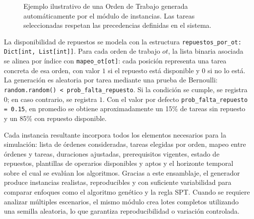 \begin{figure}[H]
\centering
\shorthandoff{>}
\shorthandon{>}
\caption{Ejemplo ilustrativo de una Orden de Trabajo generada automáticamente por el módulo de instancias. Las tareas seleccionadas respetan las precedencias definidas en el sistema.}
\label{fig:ot_ejemplo}
\end{figure}

La disponibilidad de repuestos se modela con la estructura \texttt{repuestos\_por\_ot: Dict[int, List[int]]}.
Para cada orden de trabajo \(ot\), la lista binaria asociada se alinea por índice con \texttt{mapeo\_ot[ot]}:
cada posición representa una tarea concreta de esa orden, con valor \(1\) si el repuesto está disponible
y \(0\) si no lo está. La generación es aleatoria por tarea mediante una prueba de Bernoulli:
\texttt{random.random() < prob\_falta\_repuesto}. Si la condición se cumple, se registra \(0\); en caso contrario,
se registra \(1\). Con el valor por defecto \texttt{prob\_falta\_repuesto = 0.15}, en promedio se obtiene
aproximadamente un 15\% de tareas sin repuesto y un 85\% con repuesto disponible.

Cada instancia resultante incorpora todos los elementos necesarios para la simulación: lista de órdenes consideradas, tareas elegidas por orden, mapeo entre órdenes y tareas, duraciones ajustadas, prerequisitos vigentes, estado de repuestos, plantillas de operarios disponibles y aptos y el horizonte temporal sobre el cual se evalúan los algoritmos. Gracias a este ensamblaje, el generador produce instancias realistas, reproducibles y con suficiente variabilidad para comparar enfoques como el algoritmo genético y la regla SPT. Cuando se requiere analizar múltiples escenarios, el mismo módulo crea lotes completos utilizando una semilla aleatoria, lo que garantiza reproducibilidad o variación controlada.

